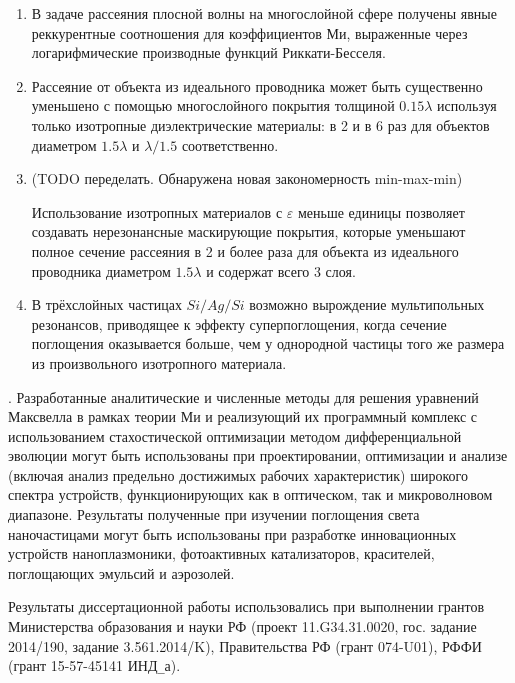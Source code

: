 \begin{enumerate}
\item В задаче рассеяния плосной волны на многослойной сфере
  получены явные реккурентные соотношения для коэффициентов Ми,
  выраженные через логарифмические производные функций
  Риккати-Бесселя.
  \item Рассеяние от объекта из идеального проводника может быть
    существенно уменьшено с помощью многослойного покрытия толщиной
    $0.15\lambda$ используя только изотропные диэлектрические
    материалы: в 2 и в 6 раз для объектов диаметром $1.5\lambda$ и
    $\lambda/1.5$ соответственно.
  \item (TODO переделать. Обнаружена новая закономерность min-max-min)

    Использование изотропных материалов с $\varepsilon$ меньше единицы
    позволяет создавать нерезонансные маскирующие покрытия, которые
    уменьшают полное сечение рассеяния в 2 и более раза для объекта
    из идеального проводника диаметром $1.5\lambda$ и содержат всего 3
    слоя.

  \item В трёхслойных частицах $Si/Ag/Si$ возможно вырождение
    мультипольных резонансов, приводящее к эффекту суперпоглощения,
    когда сечение поглощения оказывается больше, чем у однородной
    частицы того же размера из произвольного изотропного материала.
\end{enumerate}


\influence. Разработанные аналитические и численные методы для решения
уравнений Максвелла в рамках теории Ми и реализующий их
программный комплекс с использованием стахостической оптимизации
методом дифференциальной эволюции могут быть использованы при
проектировании, оптимизации и анализе (включая анализ предельно
достижимых рабочих характеристик) широкого спектра устройств,
функционирующих как в оптическом, так и микроволновом диапазоне.
Результаты полученные при изучении поглощения света наночастицами могут
быть использованы при разработке инновационных устройств
наноплазмоники, фотоактивных катализаторов, красителей, поглощающих
эмульсий и аэрозолей.

Результаты диссертационной работы использовались при выполнении
грантов Министерства образования и науки РФ
(проект 11.G34.31.0020, гос. задание 2014/190, задание 3.561.2014/K),
Правительства РФ (грант 074-U01), РФФИ (грант 15-57-45141 ИНД\verb+_+а).



